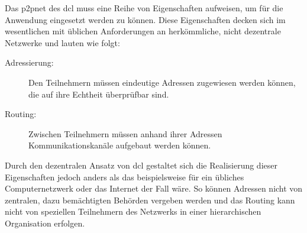 
Das \gls{p2pnet} des \gls{dcl} muss eine Reihe von Eigenschaften aufweisen,
um für die Anwendung eingesetzt werden zu können. Diese Eigenschaften decken sich im wesentlichen mit
üblichen Anforderungen an herkömmliche, nicht dezentrale Netzwerke und lauten wie folgt:
\begin{description}
	\item [{Adressierung:}]
		
		Den Teilnehmern müssen eindeutige Adressen zugewiesen werden können, die auf ihre Echtheit überprüfbar sind.
	
	
	\item [{Routing:}]
		
		Zwischen Teilnehmern müssen anhand ihrer Adressen Kommunikationskanäle aufgebaut werden können.

\end{description}

Durch den dezentralen Ansatz von \gls{dcl} gestaltet sich die Realisierung dieser Eigenschaften jedoch
anders als das beispielsweise für ein übliches Computernetzwerk oder das Internet der Fall wäre.
So können Adressen nicht von zentralen, dazu bemächtigten Behörden vergeben werden und das Routing
kann nicht von speziellen Teilnehmern des Netzwerks in einer hierarchischen Organisation erfolgen.

